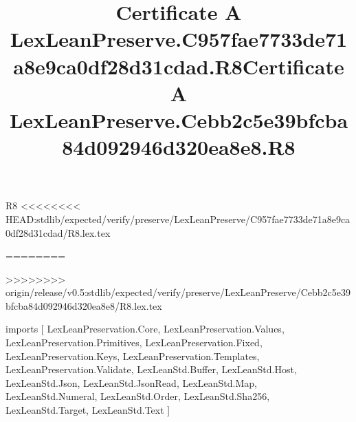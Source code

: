 \begin{lexlean}{R8}
<<<<<<<< HEAD:stdlib/expected/verify/preserve/LexLeanPreserve/C957fae7733de71a8e9ca0df28d31cdad/R8.lex.tex
\title{Certificate A LexLeanPreserve.C957fae7733de71a8e9ca0df28d31cdad.R8}
========
\title{Certificate A LexLeanPreserve.Cebb2c5e39bfcba84d092946d320ea8e8.R8}
>>>>>>>> origin/release/v0.5:stdlib/expected/verify/preserve/LexLeanPreserve/Cebb2c5e39bfcba84d092946d320ea8e8/R8.lex.tex
\begin{coremodule}
imports [
  LexLeanPreservation.Core,
  LexLeanPreservation.Values,
  LexLeanPreservation.Primitives,
  LexLeanPreservation.Fixed,
  LexLeanPreservation.Keys,
  LexLeanPreservation.Templates,
  LexLeanPreservation.Validate,
  LexLeanStd.Buffer,
  LexLeanStd.Host,
  LexLeanStd.Json,
  LexLeanStd.JsonRead,
  LexLeanStd.Map,
  LexLeanStd.Numeral,
  LexLeanStd.Order,
  LexLeanStd.Sha256,
  LexLeanStd.Target,
  LexLeanStd.Text
]


\end{coremodule}
\end{lexlean}
